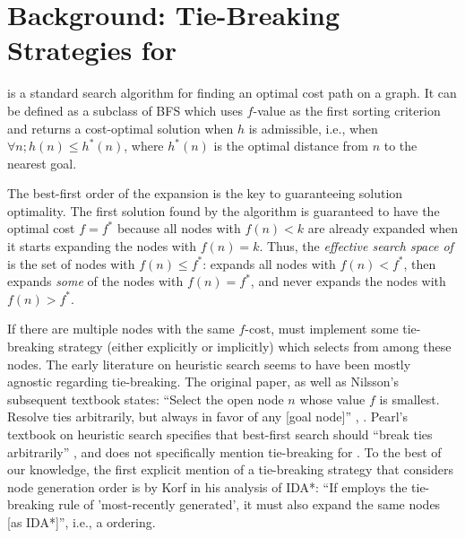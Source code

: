\section{Background: Tie-Breaking Strategies for \astar}

\label{sec:astar-background}

\astar is a standard search algorithm for finding an optimal cost path
on a graph.
It can be defined as a subclass of BFS which uses $f$-value as the first sorting criterion
and returns a cost-optimal solution when $h$ is admissible, i.e., when
$\forall n; h(n) \leq h^*(n)$, where $h^*(n)$ is the optimal distance from $n$ to
the nearest goal.

The best-first order of the expansion is the key to guaranteeing solution optimality. 
The first solution found by the algorithm is guaranteed to have the optimal cost $f=f^*$ because 
all nodes with $f(n) < k$ are already expanded when it starts expanding
the nodes with $f(n) = k$.
Thus, the \emph{effective search space of \astar} is the set of nodes with 
$f(n) \leq f^*$: \astar expands all nodes with $f(n) < f^*$, then
expands \emph{some} of the nodes with $f(n) = f^*$, and
never expands the nodes with $f(n) > f^*$.

If there are multiple nodes with the same $f$-cost, \astar
must implement some tie-breaking strategy (either
explicitly or implicitly) which selects from among these nodes.
The early literature on heuristic search seems to have been mostly agnostic regarding tie-breaking.
The original \astar paper, as well as Nilsson's subsequent textbook 
states: ``Select the open node $n$ whose value $f$
is smallest. Resolve ties arbitrarily, but always in favor of any [goal
node]'' \cite[p.102 Step 2]{hart1968formal}, \cite[p.69]{Nilsson71}.
Pearl's textbook on heuristic search specifies that best-first search should ``break ties arbitrarily'' \cite[p.48, Step 3]{pearl1984heuristics}, and does not specifically mention tie-breaking for \astar.
To the best of our knowledge, the first explicit mention of a tie-breaking strategy that considers node generation order is by Korf in his analysis of IDA*: ``If \astar employs the tie-breaking rule of 'most-recently generated', it must also expand the same nodes [as IDA*]'', i.e., a \lifo ordering.

